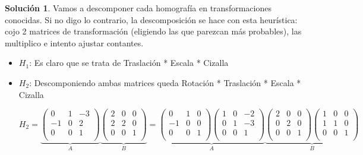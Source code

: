 \documentclass[a4paper, 11pt]{article}
\theoremstyle{definition}
\newtheorem*{solucion}{Solución}
\begin{document}
  \begin{solucion}
    Vamos a descomponer cada homografía en transformaciones conocidas. Si no digo
    lo contrario, la descomposición se hace con esta heurística: cojo 2 matrices de
    transformación (eligiendo las que parezcan más probables), las multiplico e intento
    ajustar contantes.
      \begin{itemize}
        \item $H_1$:
          Es claro que se trata de Traslación * Escala * Cizalla
        \item $H_2$:
          Descomponiendo ambas matrices queda Rotación * Traslación * Escala * Cizalla

          \[
          H_2 = \underbrace{
          \left(
          \begin{array}{ccc}
              0 & 1 & -3 \\
              -1 & 0 & 2 \\
              0 & 0 & 1 \\
          \end{array}
          \right)}_{A}
          \underbrace{
          \left(
          \begin{array}{ccc}
              2 & 0 & 0 \\
              2 & 2 & 0 \\
              0 & 0 & 1 \\
          \end{array}
          \right)}_{B} = \underbrace {\left(
                    \begin{array}{ccc}
                        0 & 1 & 0 \\
                        -1 & 0 & 0 \\
                        0 & 0 & 1 \\
                    \end{array}
                    \right)
                    \left(
                    \begin{array}{ccc}
                        1 & 0 & -2 \\
                        0 & 1 & -3 \\
                        0 & 0 & 1 \\
                    \end{array}
                    \right)}_{A}
                    \underbrace{
                    \left(
                    \begin{array}{ccc}
                        2 & 0 & 0 \\
                        0 & 2 & 0 \\
                        0 & 0 & 1 \\
                    \end{array}
                    \right)
                    \left(
                    \begin{array}{ccc}
                        1 & 0 & 0 \\
                        1 & 1 & 0 \\
                        0 & 0 & 1 \\
                    \end{array}
                    \right)}_{B}
          \]


\end{itemize}
\end{solucion}
\end{document}
